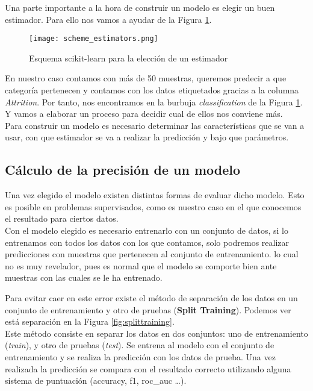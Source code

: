 Una parte importante a la hora de construir un modelo es elegir un buen estimador. Para ello nos vamos a ayudar de la Figura \ref{fig:scheme_estimators}.

\begin{figure}
	\centering
	\texttt{[image: scheme\_estimators.png]}
	\caption{Esquema scikit-learn para la elección de un estimador}
	\label{fig:scheme_estimators}
\end{figure}


En nuestro caso contamos con más de 50 muestras, queremos predecir a que categoría pertenecen y contamos con los datos etiquetados gracias a la columna \textit{Attrition}.
Por tanto, nos encontramos en la burbuja \textit{classification} de la Figura \ref{fig:scheme_estimators}.
Y vamos a elaborar un proceso para decidir cual de ellos nos conviene más.\\

Para construir un modelo es necesario determinar las características que se van a usar, con que estimador se va a realizar la predicción y bajo que parámetros.

\subsection{Cálculo de la precisión de un modelo}
Una vez elegido el modelo existen distintas formas de evaluar dicho modelo. Esto es posible en problemas supervisados, como es nuestro caso en el que conocemos el resultado para ciertos datos.\\

Con el modelo elegido es necesario entrenarlo con un conjunto de datos, si lo entrenamos con todos los datos con los que contamos, solo podremos realizar predicciones con muestras que pertenecen al conjunto de entrenamiento. lo cual no es muy revelador, pues es normal que el modelo se comporte bien ante muestras con las cuales se le ha entrenado.

Para evitar caer en este error existe el método de separación de los datos en un conjunto de entrenamiento y otro de pruebas (\textbf{Split Training}). Podemos ver está separación en la Figura \ref{fig:splittraining}.\\

Este método consiste en separar los datos en dos conjuntos: uno de entrenamiento (\textit{train}), y otro de pruebas (\textit{test}).	
Se entrena al modelo con el conjunto de entrenamiento y se realiza la predicción con los datos de prueba. Una vez realizada la predicción se compara con el resultado correcto utilizando alguna sistema de puntuación (accuracy, f1, roc\_auc \ldots).


